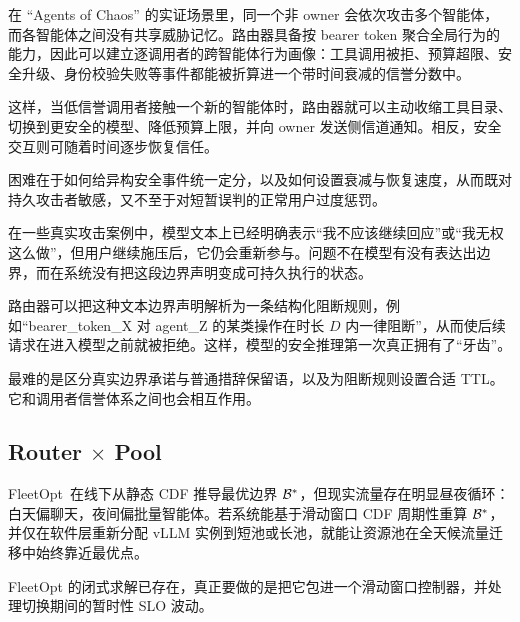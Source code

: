 \begin{opportunity}[跨智能体威胁传播的全局调用者信誉]
\label{opp:caller-reputation}
在 “Agents of Chaos” 的实证场景里，同一个非 owner 会依次攻击多个智能体，而各智能体之间没有共享威胁记忆。路由器具备按 bearer token 聚合全局行为的能力，因此可以建立逐调用者的跨智能体行为画像：工具调用被拒、预算超限、安全升级、身份校验失败等事件都能被折算进一个带时间衰减的信誉分数中。

这样，当低信誉调用者接触一个新的智能体时，路由器就可以主动收缩工具目录、切换到更安全的模型、降低预算上限，并向 owner 发送侧信道通知。相反，安全交互则可随着时间逐步恢复信任。

\begin{frisk}
困难在于如何给异构安全事件统一定分，以及如何设置衰减与恢复速度，从而既对持久攻击者敏感，又不至于对短暂误判的正常用户过度惩罚。
\end{frisk}
\end{opportunity}

\begin{opportunity}[路由器强制执行的行为承诺]
\label{opp:behavioral-commitments}
在一些真实攻击案例中，模型文本上已经明确表示“我不应该继续回应”或“我无权这么做”，但用户继续施压后，它仍会重新参与。问题不在模型有没有表达出边界，而在系统没有把这段边界声明变成可持久执行的状态。

路由器可以把这种文本边界声明解析为一条结构化阻断规则，例如“bearer\_token\_X 对 agent\_Z 的某类操作在时长 $D$ 内一律阻断”，从而使后续请求在进入模型之前就被拒绝。这样，模型的安全推理第一次真正拥有了“牙齿”。

\begin{frisk}
最难的是区分真实边界承诺与普通措辞保留语，以及为阻断规则设置合适 TTL。它和调用者信誉体系之间也会相互作用。
\end{frisk}
\end{opportunity}

\subsection{Router $\times$ Pool}

\begin{opportunity}
\label{opp:dynamic-boundary}
FleetOpt~\cite{fleetopt2026}在线下从静态 CDF 推导最优边界 $\mathcal{B}^*$，但现实流量存在明显昼夜循环：白天偏聊天，夜间偏批量智能体。若系统能基于滑动窗口 CDF 周期性重算 $\mathcal{B}^*$，并仅在软件层重新分配 vLLM 实例到短池或长池，就能让资源池在全天候流量迁移中始终靠近最优点。

\begin{frisk}
FleetOpt 的闭式求解已存在，真正要做的是把它包进一个滑动窗口控制器，并处理切换期间的暂时性 SLO 波动。
\end{frisk}
\end{opportunity}

